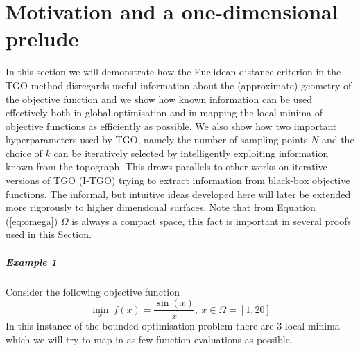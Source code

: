 \chapter{Motivation and a one-dimensional prelude} \label{sec:motivation}

In this section we will demonstrate how the Euclidean distance criterion in the TGO method disregards useful information about the (approximate) geometry of the objective function and we show how known information can be used effectively both in global optimisation and in mapping the local minima of objective functions as efficiently as possible. We also show how two important hyperparameters used by TGO, namely the number of sampling points $N$ and the choice of $k$ can be iteratively selected by intelligently exploiting information known from the topograph. This draws parallels to other works on iterative versions of TGO (I-TGO) \cite{Torn1996} trying to extract information from black-box objective functions. The informal, but intuitive ideas developed here will later be extended more rigorously to higher dimensional surfaces. Note that from Equation (\ref{eq:omega}) $\Omega$ is always a compact space, this fact is important in several proofs used in this Section. %
\paragraph{Example 1}Consider the following objective function
\begin{equation} \label{eq:test1}
\underset{x}{\min} ~f(x) = \frac{\sin(x)}{x}, ~ x \in  \Omega = [1, 20]
\end{equation}
In this instance of the bounded optimisation problem there are 3 local minima which we will try to map in as few function evaluations as possible. 

